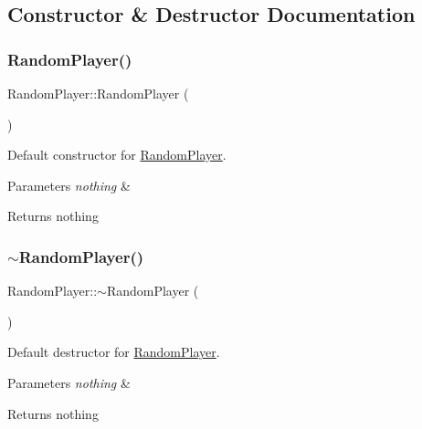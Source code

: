 \subsection{Constructor \& Destructor Documentation}
\mbox{\label{classRandomPlayer_a966ea01a29775e7eb52ff0fffcd34f12}} 
\subsubsection{\texorpdfstring{Random\+Player()}{RandomPlayer()}}
{\footnotesize\ttfamily Random\+Player\+::\+Random\+Player (\begin{DoxyParamCaption}{ }\end{DoxyParamCaption})}



Default constructor for \mbox{\hyperlink{classRandomPlayer}{Random\+Player}}. 


\begin{DoxyParams}{Parameters}
{\em nothing} & \\
\hline
\end{DoxyParams}
\begin{DoxyReturn}{Returns}
nothing 
\end{DoxyReturn}
\mbox{\label{classRandomPlayer_aa0bac4df423cda35cbb4639da37bdaaf}} 
\subsubsection{\texorpdfstring{$\sim$\+Random\+Player()}{~RandomPlayer()}}
{\footnotesize\ttfamily Random\+Player\+::$\sim$\+Random\+Player (\begin{DoxyParamCaption}{ }\end{DoxyParamCaption})\hspace{0.3cm}{\ttfamily [virtual]}}



Default destructor for \mbox{\hyperlink{classRandomPlayer}{Random\+Player}}. 


\begin{DoxyParams}{Parameters}
{\em nothing} & \\
\hline
\end{DoxyParams}
\begin{DoxyReturn}{Returns}
nothing 
\end{DoxyReturn}



